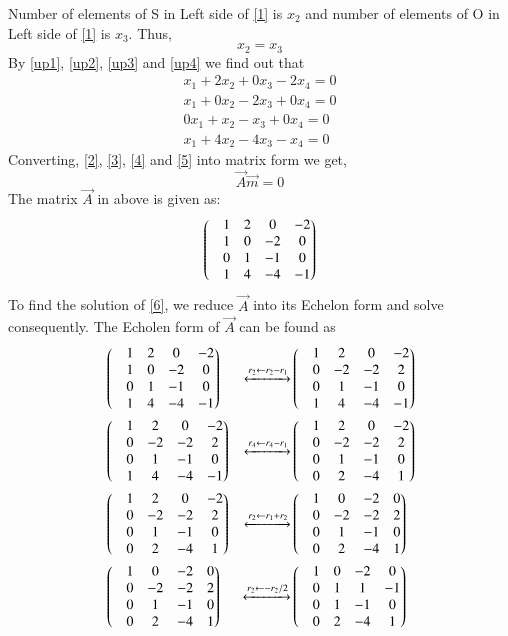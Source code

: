 \documentclass[journal,12pt,twocolumn]{IEEEtran}
\begin{document}
Number of elements of S in Left side of \ref{1} is $x_2$ and number of elements of O in Left side of \ref{1} is $x_3$. Thus,
\begin{equation}\label{up4}
	x_2 = x_3
\end{equation}
By \ref{up1}, \ref{up2}, \ref{up3} and \ref{up4} we find out that
\begin{align}
	 x_1  +  2x_2  +  0x_3 - 2x_4 =   0 \label{2} \\
	 x_1  +  0x_2  - 2x_3 + 0x_4  =  0 \label{3} \\
     0x_1   + x_2 - x_3 + 0x_4   = 0 \label{4} \\
	 x_1 +  4x_2 - 4x_3 - x_4  = 0 \label{5}
\end{align}
Converting, \ref{2}, \ref{3}, \ref{4} and \ref{5} into matrix form we get,
\begin{equation}\label{6}
	\vec{A}\vec{m} = 0
\end{equation}
The matrix $\vec{A}$ in above is given as:
\begin{equation}
	\begin{pmatrix}&1 &2 &0 &-2 \\ &1 &0 &-2 &0 \\ &0 &1 &-1 &0 \\&1 &4 &-4 &-1\end{pmatrix}
\end{equation}
To find the solution of \ref{6}, we reduce $\vec{A}$ into its Echelon form and solve consequently. The Echolen form of $\vec{A}$ can be found as
\begin{align}
 & \begin{pmatrix}&1 &2 & 0 &-2 \\ &1 &0 &-2 & 0 \\ &0 &1 &-1 &0 \\&1 &4 &-4 &-1\end{pmatrix} &\xleftrightarrow[]{r_2 \leftarrow r_2 - r_1} &\begin{pmatrix}&1 &2 &0 &-2 \\ &0 &-2 &-2 &2 \\ &0 &1 &-1 &0 \\&1 &4 &-4 &-1\end{pmatrix} \\
 & \begin{pmatrix}&1 &2 &0 &-2 \\ &0 &-2 &-2 &2 \\ &0 &1 &-1 &0 \\&1 &4 &-4 &-1\end{pmatrix} &\xleftrightarrow[]{r_4 \leftarrow r_4 - r_1}&\begin{pmatrix}&1 &2 &0 &-2 \\ &0 &-2 &-2 &2 \\ &0 &1 &-1 &0 \\&0 &2 &-4 &1\end{pmatrix} \\
 & \begin{pmatrix}&1 &2 &0 &-2 \\ &0 &-2 &-2 &2 \\ &0 &1 &-1 &0 \\&0 &2 &-4 &1\end{pmatrix} &\xleftrightarrow[]{r_2 \leftarrow r_1 + r_2} &\begin{pmatrix}&1 &0 &-2 &0 \\ &0 &-2 &-2 &2 \\ &0 &1 &-1 &0 \\&0 &2 &-4 &1\end{pmatrix} \\
 & \begin{pmatrix}&1 &0 &-2 &0 \\ &0 &-2 &-2 &2 \\ &0 &1 &-1 &0 \\&0 &2 &-4 &1\end{pmatrix} &\xleftrightarrow[]{r_2 \leftarrow -r_2/2 } &\begin{pmatrix}&1 &0 &-2 &0 \\ &0 &1 &1 &-1 \\ &0 &1 &-1 &0 \\&0 &2 &-4 &1\end{pmatrix}
\end{align}
\end{document}
